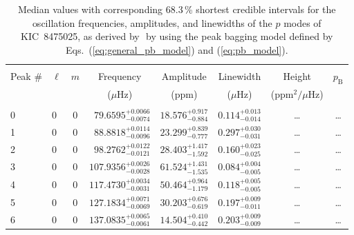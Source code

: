\begin{table*}[!]
\caption{Median values with corresponding 68.3\,\% shortest credible intervals for the oscillation frequencies, amplitudes, and linewidths of the $p$ modes of KIC~8475025, as derived by \diamonds\,\,by using the peak bagging model defined by Eqs.~(\ref{eq:general_pb_model}) and (\ref{eq:pb_model}).}
\label{tab:8475025p}
\centering
\begin{tabular}{llcrrlrc}
\hline\hline
\\[-8pt]          
Peak \# & $\ell$ & $m$ & \multicolumn{1}{c}{Frequency} & \multicolumn{1}{c}{Amplitude} & \multicolumn{1}{c}{Linewidth} & \multicolumn{1}{c}{Height}& $p_\mathrm{B}$\\
 & & & \multicolumn{1}{c}{($\mu$Hz)} & \multicolumn{1}{c}{(ppm)} & \multicolumn{1}{c}{($\mu$Hz)} & \multicolumn{1}{c}{(ppm$^2/\mu$Hz)}\\
\hline \\[-8pt]
0 & 0 & 0 & $     79.6595_{-      0.0074}^{+      0.0066}$ & $      18.576_{-       0.884}^{+       0.917}$ & $       0.114_{-       0.014}^{+       0.013}$ & \multicolumn{1}{c}{\dots} & \dots \\[1pt]
1 & 0 & 0 & $     88.8818_{-      0.0096}^{+      0.0114}$ & $      23.299_{-       0.777}^{+       0.839}$ & $       0.297_{-       0.031}^{+       0.030}$ & \multicolumn{1}{c}{\dots} & \dots \\[1pt]
2 & 0 & 0 & $     98.2762_{-      0.0121}^{+      0.0122}$ & $      28.403_{-       1.592}^{+       1.417}$ & $       0.160_{-       0.025}^{+       0.023}$ & \multicolumn{1}{c}{\dots} & \dots \\[1pt]
3 & 0 & 0 & $    107.9356_{-      0.0028}^{+      0.0026}$ & $      61.524_{-       1.535}^{+       1.431}$ & $       0.084_{-       0.005}^{+       0.004}$ & \multicolumn{1}{c}{\dots} & \dots \\[1pt]
4 & 0 & 0 & $    117.4730_{-      0.0031}^{+      0.0034}$ & $      50.464_{-       1.179}^{+       0.964}$ & $       0.118_{-       0.005}^{+       0.005}$ & \multicolumn{1}{c}{\dots} & \dots \\[1pt]
5 & 0 & 0 & $    127.1834_{-      0.0069}^{+      0.0071}$ & $      30.203_{-       0.619}^{+       0.676}$ & $       0.197_{-       0.011}^{+       0.009}$ & \multicolumn{1}{c}{\dots} & \dots \\[1pt]
6 & 0 & 0 & $    137.0835_{-      0.0061}^{+      0.0065}$ & $      14.504_{-       0.442}^{+       0.410}$ & $       0.203_{-       0.009}^{+       0.009}$ & \multicolumn{1}{c}{\dots} & \dots \\[1pt]

\end{tabular}
\end{table*}
